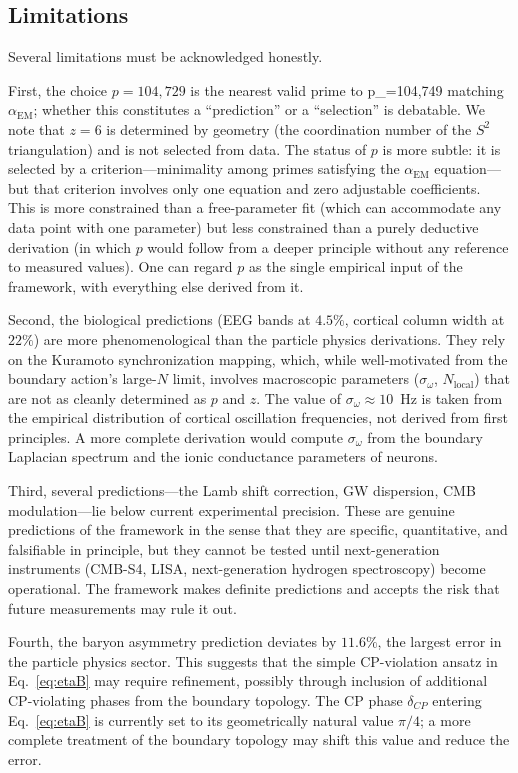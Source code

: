 \documentclass[aps,prd,twocolumn,superscriptaddress,longbibliography,nofootinbib]{revtex4-2}
\newcommand{\Stwo}{S^2}
\newcommand{\alphaEM}{\alpha_{\mathrm{EM}}}
\begin{document}
\subsection{Limitations}

Several limitations must be acknowledged honestly.

First, the choice $p = 104{,}729$ is the nearest valid prime to p_=104{,}749 matching
$\alphaEM$; whether this constitutes a ``prediction'' or a
``selection'' is debatable.  We note that $z = 6$ is determined by
geometry (the coordination number of the $\Stwo$ triangulation) and
is not selected from data.  The status of $p$ is more subtle: it is
selected by a criterion---minimality among primes satisfying the
$\alphaEM$ equation---but that criterion involves only one equation
and zero adjustable coefficients.  This is more constrained than a
free-parameter fit (which can accommodate any data point with one
parameter) but less constrained than a purely deductive derivation
(in which $p$ would follow from a deeper principle without any
reference to measured values).  One can regard $p$ as the single
empirical input of the framework, with everything else derived from
it.

Second, the biological predictions (EEG bands at $4.5\%$, cortical
column width at $22\%$) are more phenomenological than the particle
physics derivations.  They rely on the Kuramoto synchronization
mapping, which, while well-motivated from the boundary action's
large-$N$ limit, involves macroscopic parameters
($\sigma_\omega$, $N_{\mathrm{local}}$) that are not as cleanly
determined as $p$ and $z$.  The value of $\sigma_\omega \approx 10$~Hz
is taken from the empirical distribution of cortical oscillation
frequencies, not derived from first principles.  A more complete
derivation would compute $\sigma_\omega$ from the boundary Laplacian
spectrum and the ionic conductance parameters of neurons.

Third, several predictions---the Lamb shift correction, GW
dispersion, CMB modulation---lie below current experimental
precision.  These are genuine predictions of the framework in the
sense that they are specific, quantitative, and falsifiable in
principle, but they cannot be tested until next-generation
instruments (CMB-S4, LISA, next-generation hydrogen spectroscopy)
become operational.  The framework makes definite predictions and
accepts the risk that future measurements may rule it out.

Fourth, the baryon asymmetry prediction deviates by $11.6\%$,
the largest error in the particle physics sector.  This suggests
that the simple CP-violation ansatz in
Eq.~\eqref{eq:etaB} may require refinement, possibly through
inclusion of additional CP-violating phases from the boundary
topology.  The CP phase $\delta_{CP}$ entering
Eq.~\eqref{eq:etaB} is currently set to its geometrically natural
value $\pi/4$; a more complete treatment of the boundary topology
may shift this value and reduce the error.
\end{document}
